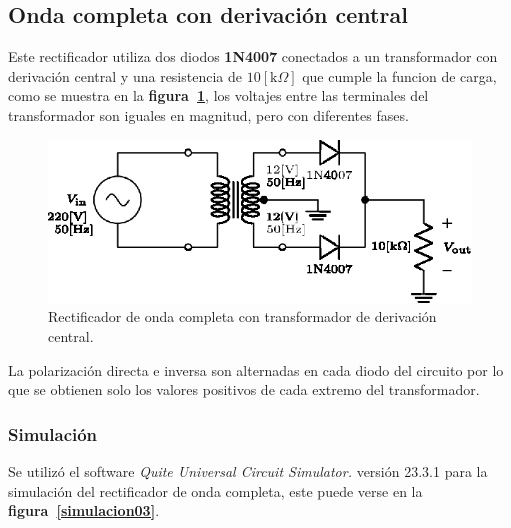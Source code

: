 \subsection{Onda completa con derivación central}
Este rectificador utiliza dos diodos \textbf{1N4007} conectados a un
transformador con derivación central y una resistencia de $10[\text{k}\Omega]$
que cumple la funcion de carga, como se muestra en la
\textbf{figura~\ref{circuito03}}, los voltajes entre las terminales del
transformador son iguales en magnitud, pero con diferentes fases.

\begin{figure}[!h]
\centering
\includegraphics[scale=1]{diagramas/03.derivacion_central1.eps}
\caption{Rectificador de onda completa con transformador de derivación central.}
\label{circuito03}
\end{figure}

La polarización directa e inversa son alternadas en cada diodo del circuito por
lo que se obtienen solo los valores positivos de cada extremo del transformador.

\subsubsection{Simulación}
Se utilizó el software \emph{Quite Universal Circuit Simulator.} versión 23.3.1
para la simulación del rectificador de onda completa, este puede verse en la
\textbf{figura~\ref{simulacion03}}.

